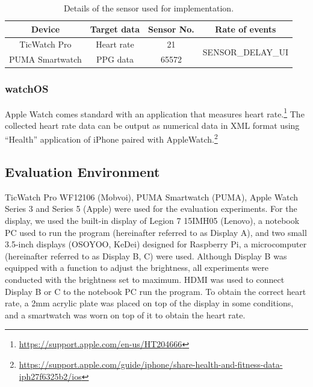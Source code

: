 \documentclass[sigchi,authordraft]{acmart}
\begin{document}
\begin{table}[!t]
  \centering
  \caption{Details of the sensor used for implementation.}
  \begin{tabular}{c|c|c|c} \hline\hline
    Device & Target data & Sensor No. & Rate of events \\ \hline
    TicWatch Pro & Heart rate & 21 & \multirow{2}{*}{SENSOR\_DELAY\_UI} \\
    PUMA Smartwatch & PPG data & 65572 & \\ \hline
  \end{tabular}
  \label{tab:sensor_param}
\end{table}


\subsubsection{watchOS}
\label{subsec:applewatch}
Apple Watch comes standard with an application that measures heart rate.\footnote{\url{https://support.apple.com/en-us/HT204666}} The collected heart rate data can be output as numerical data in XML format using ``Health'' application of iPhone paired with AppleWatch.\footnote{\url{https://support.apple.com/guide/iphone/share-health-and-fitness-data-iph27f6325b2/ios}}


\subsection{Evaluation Environment}
TicWatch Pro WF12106 (Mobvoi), PUMA Smartwatch (PUMA), Apple Watch Series 3 and Series 5 (Apple) were used for the evaluation experiments. For the display, we used the built-in display of Legion 7 15IMH05 (Lenovo), a notebook PC used to run the program (hereinafter referred to as Display A), and two small 3.5-inch displays (OSOYOO, KeDei) designed for Raspberry Pi, a microcomputer (hereinafter referred to as Display B, C) were used. Although Display B was equipped with a function to adjust the brightness, all experiments were conducted with the brightness set to maximum. HDMI was used to connect Display B or C to the notebook PC run the program. To obtain the correct heart rate, a 2mm acrylic plate was placed on top of the display in some conditions, and a smartwatch was worn on top of it to obtain the heart rate.
\end{document}
